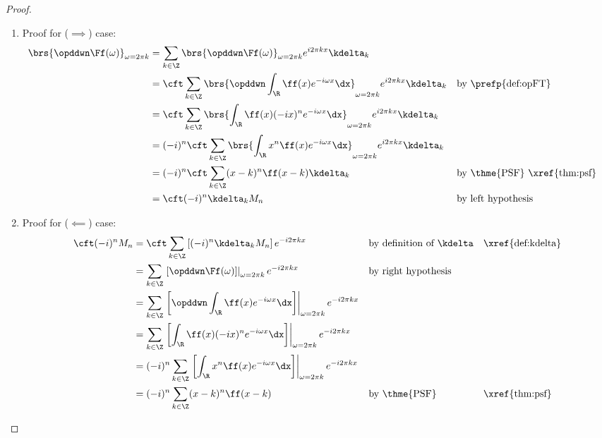 \begin{proof}
\begin{enumerate}
  \item Proof for ($\implies$) case:
    \begin{align*}
      \brs{\opddwn  \Ff(\omega)}_{\omega=2\pi k}
        &= \sum_{k\in\Z} \brs{\opddwn  \Ff(\omega)}_{\omega=2\pi k}  e^{i2\pi kx} \kdelta_k
      \\&= \cft \sum_{k\in\Z} \brs{\opddwn \int_\R  \ff(x) e^{-i\omega x} \dx}_{\omega=2\pi k} e^{i2\pi kx}  \kdelta_k
        && \text{by \prefp{def:opFT}}
      \\&= \cft \sum_{k\in\Z} \brs{\int_\R  \ff(x)(-ix)^n e^{-i\omega x} \dx}_{\omega=2\pi k} e^{i2\pi kx}  \kdelta_k
      \\&= (-i)^n \cft \sum_{k\in\Z} \brs{\int_\R  x^n \ff(x)  e^{-i\omega x} \dx}_{\omega=2\pi k} e^{i2\pi kx}  \kdelta_k
      \\&= (-i)^n \cft \sum_{k\in\Z} (x-k)^n \ff(x-k)  \kdelta_k
        && \text{by \thme{PSF} \xref{thm:psf}}
      \\&= \cft (-i)^n \kdelta_k M_n
        && \text{by left hypothesis}
    \end{align*}

 
  \item Proof for ($\impliedby$) case:
    \begin{align*}
      \cft (-i)^n M_n
        &= \cft \sum_{k\in\Z} \left[(-i)^n \kdelta_k M_n \right] e^{-i2\pi kx}
        && \text{by definition of $\kdelta$}
        && \text{\xref{def:kdelta}}
      \\&= \sum_{k\in\Z} \left. 
           \left[\opddwn  \Ff(\omega)\right]\right|_{\omega=2\pi k} 
           e^{-i2\pi kx}
        && \text{by right hypothesis}
      \\&= \sum_{k\in\Z} \left. 
           \left[
           \opddwn 
           \int_\R  \ff(x) e^{-i\omega x} \dx
           \right]
           \right|_{\omega=2\pi k} e^{-i2\pi kx}
      \\&= \sum_{k\in\Z} \left. 
           \left[
           \int_\R  \ff(x)(-ix)^n e^{-i\omega x} \dx
           \right]
           \right|_{\omega=2\pi k} e^{-i2\pi kx}
      \\&= (-i)^n \sum_{k\in\Z} \left.
           \left[
           \int_\R  x^n \ff(x)  e^{-i\omega x} \dx
           \right]
           \right|_{\omega=2\pi k} e^{-i2\pi kx}
      \\&= (-i)^n \sum_{k\in\Z} (x-k)^n \ff(x-k) 
        && \text{by \thme{PSF}}
        && \text{\xref{thm:psf}}
    \end{align*}

\end{enumerate}
\end{proof}

